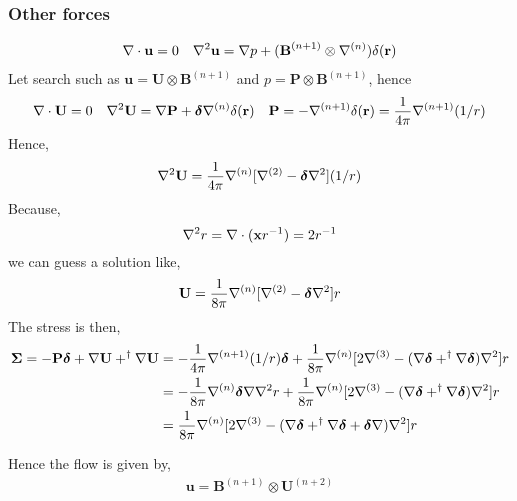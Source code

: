\subsubsection{Other forces}
\begin{align}
    \mathbf{\nabla}\cdot\textbf{u}= 0 
    &&
    \mathbf{\nabla}^2\textbf{u}=\mathbf{\nabla} p+ (\textbf{B}^{(n+1)}\otimes \mathbf{\nabla}^{(n)})\delta(\textbf{r})
\end{align}
Let search such as $\textbf{u} = \textbf{U}\otimes \textbf{B}^{(n+1)}$ and $p = \textbf{P}\otimes \textbf{B}^{(n+1)}$, 
hence 
\begin{align}
    \mathbf{\nabla}\cdot\textbf{U}= 0 
    &&
    \mathbf{\nabla}^2\textbf{U}=\mathbf{\nabla} \textbf{P}+ \bm\delta \mathbf{\nabla}^{(n)} \delta(\textbf{r})
    &&
     \textbf{P} = - \mathbf{\nabla}^{(n+1)} \delta(\textbf{r})
    = \frac{1}{4\pi} \mathbf{\nabla}^{(n+1)} (1/r)
\end{align}
Hence, 
\begin{align}
    \mathbf{\nabla}^2\textbf{U}
    =  \frac{1}{4\pi} \mathbf{\nabla}^{(n)}[\mathbf{\nabla}^{(2)} - \bm\delta \mathbf{\nabla}^2](1/r)
\end{align}
Because,
\begin{equation}
    \mathbf{\nabla}^2 r= \mathbf{\nabla}\cdot(\textbf{x}r^{-1}) =2 r^{-1}
\end{equation}
we can guess a solution like, 
\begin{equation}
    \textbf{U}= 
    \frac{1}{8\pi} \mathbf{\nabla}^{(n)}[\mathbf{\nabla}^{(2)} - \bm\delta \mathbf{\nabla}^2] r
\end{equation}
The stress is then,
\begin{align}
    \bm\Sigma
    =
    -\textbf{P}\bm\delta
    + \mathbf{\nabla} \textbf{U}
    + ^\dagger \mathbf{\nabla} \textbf{U}
    &=
    -\frac{1}{4\pi}\mathbf{\nabla}^{(n+1)}(1/r)\bm\delta 
    +\frac{1}{8\pi}\mathbf{\nabla}^{(n)}[2\mathbf{\nabla}^{(3)} - (\mathbf{\nabla}\bm\delta + ^\dagger\mathbf{\nabla}\bm\delta) \mathbf{\nabla}^2] r\\
    &=
    -\frac{1}{8\pi}\mathbf{\nabla}^{(n)}\bm\delta \mathbf{\nabla}\mathbf{\nabla}^2 r 
    +\frac{1}{8\pi}\mathbf{\nabla}^{(n)}[2\mathbf{\nabla}^{(3)} - (\mathbf{\nabla}\bm\delta + ^\dagger\mathbf{\nabla}\bm\delta) \mathbf{\nabla}^2] r\\
    &=
    \frac{1}{8\pi}\mathbf{\nabla}^{(n)}[2\mathbf{\nabla}^{(3)} - (\mathbf{\nabla}\bm\delta + ^\dagger\mathbf{\nabla}\bm\delta+\bm\delta\mathbf{\nabla}) \mathbf{\nabla}^2] r\\
\end{align}


Hence the flow is given by, 
\begin{align}
    \textbf{u}= \textbf{B}^{(n+1)}\otimes \textbf{U}^{(n+2)}
\end{align}

